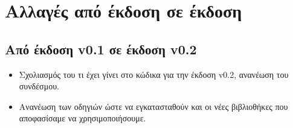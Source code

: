 \documentclass[12pt,a4paper]{article}
\begin{document}
\section{Αλλαγές από έκδοση σε έκδοση}

\subsection{Από έκδοση v0.1 σε έκδοση v0.2}
\begin{itemize}
    \item Σχολιασμός του τι έχει γίνει στο κώδικα για την έκδοση v0.2, ανανέωση του συνδέσμου.
    \item Ανανέωση των οδηγιών ώστε να εγκατασταθούν και οι νέες βιβλιοθήκες που αποφασίσαμε να χρησιμοποιήσουμε.
\end{itemize}
\end{document}
